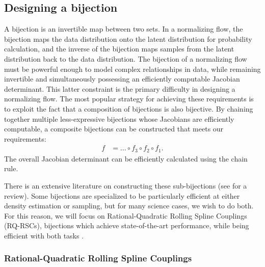 \documentclass[twocolumn,twocolappendix]{aastex631}
\begin{document}
\subsection{Designing a bijection}
\label{sec:bijections}

A bijection is an invertible map between two sets.
In a normalizing flow, the bijection maps the data distribution onto the latent distribution for probability calculation, and the inverse of the bijection maps samples from the latent distribution back to the data distribution.
The bijection of a normalizing flow must be powerful enough to model complex relationships in data, while remaining invertible and simultaneously possessing an efficiently computable Jacobian determinant.
This latter constraint is the primary difficulty in designing a normalizing flow.
The most popular strategy for achieving these requirements is to exploit the fact that a composition of bijections is also bijective.
By chaining together multiple less-expressive bijections whose Jacobians are efficiently computable, a composite bijections can be constructed that meets our requirements:
\begin{align}
    f &= \dots \circ f_3 \circ f_2 \circ f_1.
\end{align}
The overall Jacobian determinant can be efficiently calculated using the chain rule.

There is an extensive literature on constructing these sub-bijections (see \citealt{kobyzev2020} for a review).
Some bijections are specialized to be particularly efficient at either density estimation or sampling, but for many science cases, we wish to do both.
For this reason, we will focus on Rational-Quadratic Rolling Spline Couplings (RQ-RSCs), bijections which achieve state-of-the-art performance, while being efficient with both tasks \citep{durkan2019}.

\subsubsection{Rational-Quadratic Rolling Spline Couplings}
\label{sec:rq-rsc}
\end{document}
